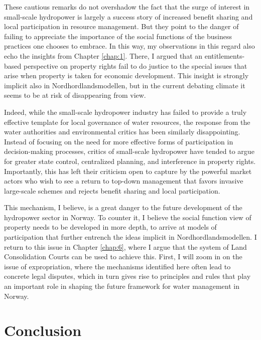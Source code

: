 These cautious remarks do not overshadow the fact that the surge of interest in small-scale hydropower is largely a success story of increased benefit sharing and local participation in resource management. But they point to the danger of failing to appreciate the importance of the social functions of the business practices one chooses to embrace. In this way, my observations in this regard also echo the insights from Chapter \ref{chap:1}. There, I argued that an entitlements-based perspective on property rights fail to do justice to the special issues that arise when property is taken for economic development. This insight is strongly implicit also in Nordhordlandsmodellen, but in the current debating climate it seems to be at risk of disappearing from view. 

Indeed, while the small-scale hydropower industry has failed to provide a truly effective template for local governance of water resources, the response from the water authorities and environmental critics has been similarly disappointing. Instead of focusing on the need for more effective forms of participation in decision-making processes, critics of small-scale hydropower have tended to argue for greater state control, centralized planning, and interference in property rights. Importantly, this has left their criticism open to capture by the powerful market actors who wish to see a return to top-down management that favors invasive large-scale schemes and rejects benefit sharing and local participation. 

This mechanism, I believe, is a great danger to the future development of the hydropower sector in Norway. To counter it, I believe the social function view of property needs to be developed in more depth, to arrive at models of participation that further entrench the ideas implicit in Nordhordlandsmodellen. I return to this issue in Chapter \ref{chap:6}, where I argue that the system of Land Consolidation Courts can be used to achieve this. First, I will zoom in on the issue of expropriation, where the mechanisms identified here often lead to concrete legal disputes, which in turn gives rise to principles and rules that play an important role in shaping the future framework for water management in Norway. 

\section{Conclusion}\label{sec:conc3}

